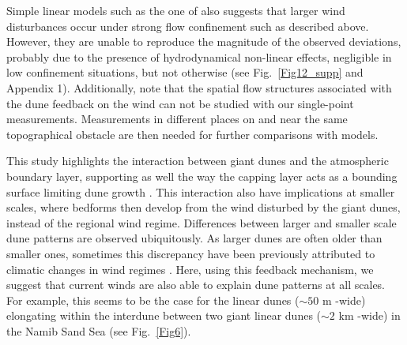  Simple linear models such as the one of \citet{andreotti2009} also suggests that larger wind disturbances occur under strong flow confinement such as described above. However, they are unable to reproduce the magnitude of the observed deviations, probably due to the presence of hydrodynamical non-linear effects, negligible in low confinement situations, but not otherwise (see Fig.~\ref{Fig12_supp} and Appendix 1). Additionally, note that the spatial flow structures associated with the dune feedback on the wind can not be studied with our single-point measurements. Measurements in different places on and near the same topographical obstacle are then needed for further comparisons with models.

 This study highlights the interaction between giant dunes and the atmospheric boundary layer, supporting as well the way the capping layer acts as a bounding surface limiting dune growth \citep{andreotti2009, gunn2021}. This interaction also have implications at smaller scales, where bedforms then develop from the wind disturbed by the giant dunes, instead of the regional wind regime. Differences between larger and smaller scale dune patterns are observed ubiquitously. As larger dunes are often older than smaller ones, sometimes this discrepancy have been previously attributed to climatic changes in wind regimes \citep{refs}. Here, using this feedback mechanism, we suggest that current winds are also able to explain dune patterns at all scales. For example, this seems to be the case for the linear dunes ($\sim 50$ m -wide) elongating within the interdune between two giant linear dunes ($\sim 2$ km -wide) in the Namib Sand Sea (see Fig.~\ref{Fig6}).


